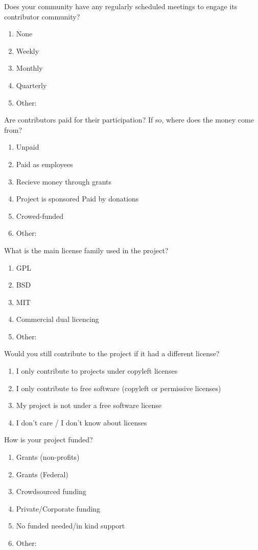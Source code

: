 \begin{table}
Does your community have any regularly scheduled meetings to engage its contributor community?
\begin{enumerate}
\item None
\item Weekly
\item Monthly
\item Quarterly
\item Other:
\end{enumerate}

Are contributors paid for their participation? If so, where does the money come from?
\begin{enumerate}
\item Unpaid
\item Paid as employees
\item Recieve money through grants
\item Project is sponsored Paid by donations
\item Crowed-funded
\item Other:
\end{enumerate}

What is the main license family used in the project?
\begin{enumerate}
\item GPL
\item BSD
\item MIT
\item Commercial dual licencing
\item Other:
\end{enumerate}

Would you still contribute to the project if it had a different license?
\begin{enumerate}
\item I only contribute to projects under copyleft licenses
\item I only contribute to free software (copyleft or permissive licenses)
\item My project is not under a free software license
\item I don't care / I don't know about licenses
\end{enumerate}

How is your project funded?
\begin{enumerate}
\item Grants (non-profits)
\item Grants (Federal)
\item Crowdsourced funding
\item Private/Corporate funding
\item No funded needed/in kind support
\item Other:
\end{enumerate}


\end{table}
